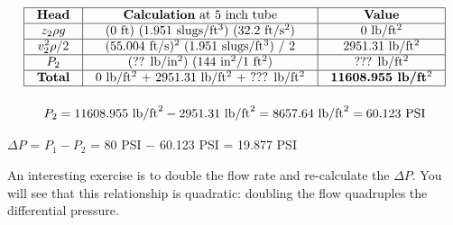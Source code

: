 \vskip 10pt


$$\vbox{\offinterlineskip
\halign{\strut
\vrule \quad\hfil # \ \hfil & 
\vrule \quad\hfil # \ \hfil & 
\vrule \quad\hfil # \ \hfil \vrule \cr
\noalign{\hrule}
%
{\bf Head} & {\bf Calculation} at 5 inch tube & {\bf Value} \cr
%
\noalign{\hrule}
%
$z_2 \rho g$ & (0 ft) (1.951 slugs/ft$^{3}$) (32.2 ft/s$^{2}$) & 0 lb/ft$^{2}$ \cr
%
\noalign{\hrule}
%
$v_2^2 \rho / 2$ & (55.004 ft/s)$^{2}$ (1.951 slugs/ft$^{3}$) / 2 & 2951.31 lb/ft$^{2}$ \cr
%
\noalign{\hrule}
%
$P_2$ & (?? lb/in$^{2}$) (144 in$^{2}$/1 ft$^{2}$) & ??? lb/ft$^{2}$ \cr
%
\noalign{\hrule}
%
{\bf Total} &  0 lb/ft$^{2}$ + 2951.31 lb/ft$^{2}$ + ??? lb/ft$^{2}$ & {\bf 11608.955 lb/ft$^{2}$} \cr
%
\noalign{\hrule}
} %
}$$ %

$$P_2 = 11608.955 \hbox{ lb/ft}^2 - 2951.31 \hbox{ lb/ft}^2 = 8657.64 \hbox{ lb/ft}^2 = 60.123 \hbox{ PSI}$$

\vskip 10pt

$\Delta P$ = $P_1 - P_2$ = 80 PSI $-$ 60.123 PSI = 19.877 PSI

\vskip 10pt

An interesting exercise is to double the flow rate and re-calculate the $\Delta P$.  You will see that this relationship is quadratic: doubling the flow quadruples the differential pressure.





